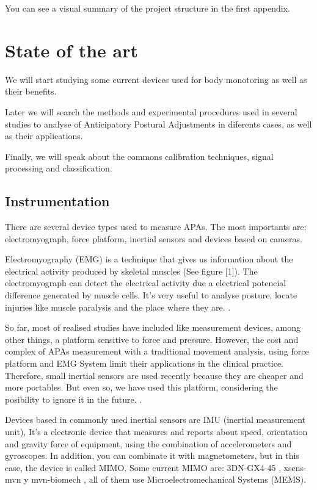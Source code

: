 You can see a visual summary of the project structure in the first appendix.

\section{State of the art}

We will start studying some current devices used for body monotoring as well as their benefits.

Later we will search the methods and experimental procedures used in several studies to analyse of Anticipatory Postural Adjustments in diferents cases, as well as their applications.

Finally, we will speak about the commons calibration techniques, signal processing and classification.


\subsection{Instrumentation}

There are several  device types used to measure APAs. The most importants are: electromyograph, force platform, inertial sensors and devices based on cameras. 

Electromyography (EMG) is a technique that gives us information about the electrical activity produced by skeletal muscles (See figure [1]). The electromyograph can detect  the electrical activity due a electrical potencial difference generated by muscle cells. It’s very useful to analyse posture, locate injuries like muscle paralysis and the place where they are. \cite{Marcio2010} \cite{Instr1}. 


So far, most of realised studies have included like measurement devices, among other things, a platform sensitive to force and pressure. However, the cost and complex of APAs measurement with a traditional movement analysis, using force platform and EMG System limit their applications in the  clinical practice. Therefore, small inertial sensors are used recently because they are cheaper and more portables. But even so, we have used this platform, considering the posibility to ignore it in the future. \cite{Mancini2009} \cite{Vennila2011}.

Devices based in commonly used inertial sensors are IMU (inertial measurement unit), It’s a electronic device that measures and reports about speed, orientation and gravity force of equipment, using the combination of accelerometers and gyroscopes.
In addition, you can combinate it with magnetometers, but in this case, the device is called MIMO. Some current MIMO are: 3DN-GX4-45 \cite{Instr2},  xsens-mvn \cite{Instr3} y mvn-biomech \cite{Instr4}, all of them use Microelectromechanical Systems (MEMS).


